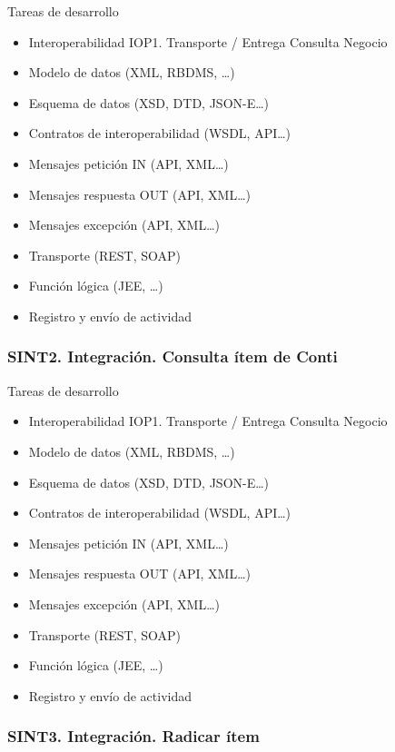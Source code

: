 \documentclass[
  paper=a4,
  ,captions=tableheading
]{scrartcl}
\providecommand{\tightlist}{%
  \setlength{\itemsep}{0pt}\setlength{\parskip}{0pt}}
\begin{document}
Tareas de desarrollo

\begin{itemize}
\tightlist
\item
  Interoperabilidad IOP1. Transporte / Entrega Consulta Negocio
\item
  Modelo de datos (XML, RBDMS, \ldots)
\item
  Esquema de datos (XSD, DTD, JSON-E\ldots)
\item
  Contratos de interoperabilidad (WSDL, API\ldots)
\item
  Mensajes petición IN (API, XML\ldots)
\item
  Mensajes respuesta OUT (API, XML\ldots)
\item
  Mensajes excepción (API, XML\ldots)
\item
  Transporte (REST, SOAP)
\item
  Función lógica (JEE, \ldots)
\item
  Registro y envío de actividad
\end{itemize}

\subsubsection{SINT2. Integración. Consulta ítem de
Conti}\label{sec:sint2.-integraciuxf3n.-consulta-uxedtem-de-conti}

Tareas de desarrollo

\begin{itemize}
\tightlist
\item
  Interoperabilidad IOP1. Transporte / Entrega Consulta Negocio
\item
  Modelo de datos (XML, RBDMS, \ldots)
\item
  Esquema de datos (XSD, DTD, JSON-E\ldots)
\item
  Contratos de interoperabilidad (WSDL, API\ldots)
\item
  Mensajes petición IN (API, XML\ldots)
\item
  Mensajes respuesta OUT (API, XML\ldots)
\item
  Mensajes excepción (API, XML\ldots)
\item
  Transporte (REST, SOAP)
\item
  Función lógica (JEE, \ldots)
\item
  Registro y envío de actividad
\end{itemize}

\subsubsection{SINT3. Integración. Radicar
ítem}\label{sec:sint3.-integraciuxf3n.-radicar-uxedtem}
\end{document}
